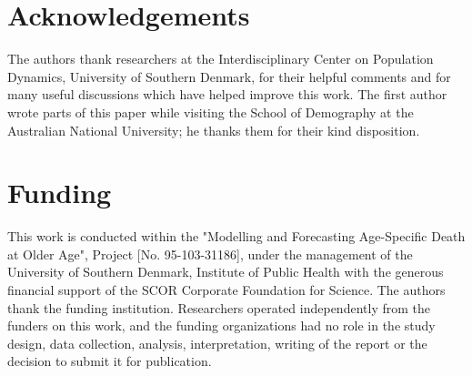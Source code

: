 \documentclass[T0_MEM]{subfiles}
\begin{document}
\section*{Acknowledgements}
The authors thank researchers at the Interdisciplinary Center on Population Dynamics, University of Southern Denmark, for their helpful comments and for many useful discussions which have helped improve this work. The first author wrote parts of this paper while visiting the School of Demography at the Australian National University; he thanks them for their kind disposition.

\section*{Funding}
This work is conducted within the "Modelling and Forecasting Age-Specific Death at Older Age", Project [No. 95-103-31186], under the management of the University of Southern Denmark, Institute of Public Health with the generous financial support of the SCOR Corporate Foundation for Science. The authors thank the funding institution. Researchers operated independently from the funders on this work, and the funding organizations had no role in the study design, data collection, analysis, interpretation, writing of the report or the decision to submit it for publication.
\end{document}
